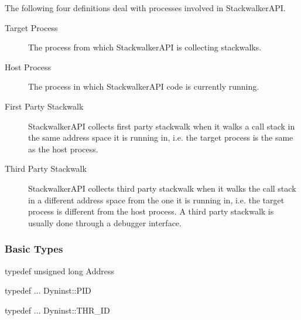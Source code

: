 The following four definitions deal with processes involved in StackwalkerAPI.
\begin{description}

\item [Target Process] The process from which StackwalkerAPI is collecting
    stackwalks.

\item [Host Process] The process in which StackwalkerAPI code is currently
    running.

\item [First Party Stackwalk] StackwalkerAPI collects first party stackwalk when
    it walks a call stack in the same address space it is running in, i.e. the
    target process is the same as the host process.

\item [Third Party Stackwalk] StackwalkerAPI collects third party stackwalk when
    it walks the call stack in a different address space from the one it is
    running in, i.e. the target process is different from the host process. A
    third party stackwalk is usually done through a debugger interface.

\end{description}

\subsubsection{Basic Types}

\begin{apient}
typedef unsigned long Address
\end{apient}
\begin{apient}
typedef ... Dyninst::PID
\end{apient}
\begin{apient}
typedef ... Dyninst::THR_ID
\end{apient}

